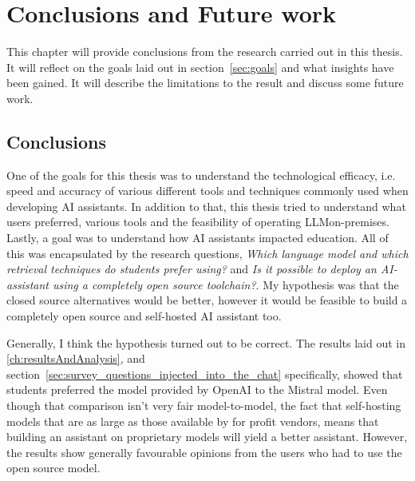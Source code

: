 ﻿\chapter{Conclusions and Future work}
\label{ch:conclusionsAndFutureWork}




This chapter will provide conclusions from the research carried out in this thesis. It will reflect on the goals laid out in section~\ref{sec:goals} and what insights have been gained. It will describe the limitations to the result and discuss some future work.


\section{Conclusions}
\label{sec:conclusions}


One of the goals for this thesis was to understand the technological efficacy, i.e. speed and accuracy of various different tools and techniques commonly used when developing AI assistants. In addition to that, this thesis tried to understand what users preferred, various tools and the feasibility of operating \gls{LLM}on-premises. Lastly, a goal was to understand how AI assistants impacted education. All of this was encapsulated by the research questions, \textit{Which language model and which retrieval techniques do students prefer using?} and \textit{Is it possible to deploy an AI-assistant using a completely open source toolchain?}. My hypothesis was that the closed source alternatives would be better, however it would be feasible to build a completely open source and self-hosted AI assistant too.


Generally, I think the hypothesis turned out to be correct. The results laid out in \autoref{ch:resultsAndAnalysis}, and section~\ref{sec:survey_questions_injected_into_the_chat} specifically, showed that students preferred the model provided by OpenAI to the Mistral model. Even though that comparison isn’t very fair model-to-model, the fact that self-hosting models that are as large as those available by for profit vendors, means that building an assistant on proprietary models will yield a better assistant. However, the results show generally favourable opinions from the users who had to use the open source model.







